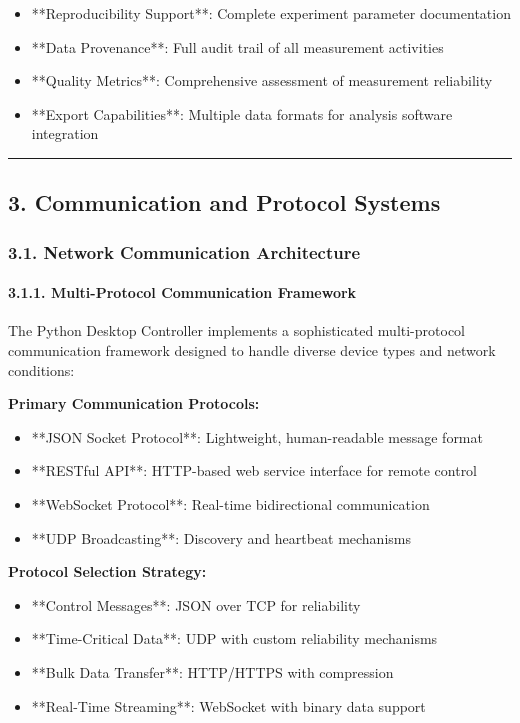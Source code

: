 \documentclass[12pt,a4paper]{article}
\begin{document}
\begin{itemize}
\item **Reproducibility Support**: Complete experiment parameter documentation
\item **Data Provenance**: Full audit trail of all measurement activities
\item **Quality Metrics**: Comprehensive assessment of measurement reliability
\item **Export Capabilities**: Multiple data formats for analysis software integration

\end{itemize}
\hrule

\subsection{3. Communication and Protocol Systems}

\subsubsection{3.1. Network Communication Architecture}

\paragraph{3.1.1. Multi-Protocol Communication Framework}

The Python Desktop Controller implements a sophisticated multi-protocol communication framework designed to handle
diverse device types and network conditions:

\textbf{Primary Communication Protocols:}

\begin{itemize}
\item **JSON Socket Protocol**: Lightweight, human-readable message format
\item **RESTful API**: HTTP-based web service interface for remote control
\item **WebSocket Protocol**: Real-time bidirectional communication
\item **UDP Broadcasting**: Discovery and heartbeat mechanisms

\end{itemize}
\textbf{Protocol Selection Strategy:}

\begin{itemize}
\item **Control Messages**: JSON over TCP for reliability
\item **Time-Critical Data**: UDP with custom reliability mechanisms
\item **Bulk Data Transfer**: HTTP/HTTPS with compression
\item **Real-Time Streaming**: WebSocket with binary data support

\end{itemize}
\end{document}
